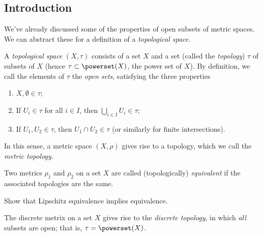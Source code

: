 \setcounter{lecture}{2}

\subsection{Introduction} %
\label{sub:top_introduction}

We've already discussed some of the properties of open subsets of metric spaces. We can abstract these for a definition of a \emph{topological space}.

\begin{definition}
	A \emph{topological space} $(X,\tau)$ consists of a set $X$ and a set (called the \emph{topology}) $\tau$ of subsets of $X$ (hence $\tau \subset \powerset(X)$, the power set of $X$). By definition, we call the elements of $\tau$ the \emph{open sets}, satisfying the three properties
	\begin{enumerate}
		\shortskip
		\item $X,\emptyset \in \tau$;
		\item If $U_i \in \tau$ for all $i\in I$, then $\bigcup_{i\in I} U_i \in \tau$;
		\item If $U_1, U_2 \in \tau$, then $U_1 \cap U_2 \in \tau$ (or similarly for finite intersections).
	\end{enumerate}
	In this sense, a metric space $(X,\rho)$ gives rise to a topology, which we call the \emph{metric topology}.

	Two metrics $\rho_1$ and $\rho_2$ on a set $X$ are called (topologically) \emph{equivalent} if the associated topologies are the same.
\end{definition}

\begin{exercise}
	Show that Lipschitz equivalence implies equivalence.
\end{exercise}

\begin{example}
	The discrete metrix on a set $X$ gives rise to the \emph{discrete topology}, in which \emph{all} subsets are open; that is, $\tau = \powerset(X)$.
\end{example}

